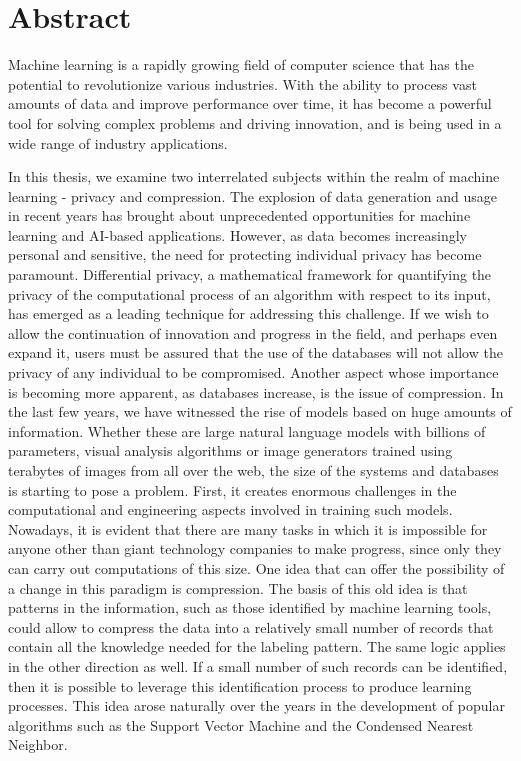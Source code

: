 \chapter*{Abstract}

Machine learning is a rapidly growing field of computer science that has the potential to revolutionize various industries. With the ability to process vast amounts of data and improve performance over time, it has become a powerful tool for solving complex problems and driving innovation, and is being used in a wide range of industry applications.


In this thesis, we examine two interrelated subjects within the realm of machine learning - privacy and compression. 
The explosion of data generation and usage in recent years has brought about unprecedented opportunities for machine learning and AI-based applications. However, as data becomes increasingly personal and sensitive, the need for protecting individual privacy has become paramount. 
Differential privacy, a mathematical framework for quantifying the privacy of the computational process of an algorithm  with respect to its input, has emerged as a leading technique for addressing this challenge. 
If we wish to allow the continuation of innovation and progress in the field, and perhaps even expand it, users must be assured that the use of the databases will not allow the privacy of any individual to be compromised.
Another aspect whose importance is becoming more apparent, as databases increase, is the issue of compression. In the last few years, we have witnessed the rise of models based on huge amounts of information. Whether these are large natural language models with billions of parameters, visual analysis algorithms or image generators trained using terabytes of images from all over the web, the size of the systems and databases is starting to pose a problem.
First, it creates enormous challenges in the computational and engineering aspects involved in training such models. Nowadays, it is evident that there are many tasks in which it is impossible for anyone other than giant technology companies to make progress, since only they can carry out computations of this size.
One idea that can offer the possibility of a change in this paradigm is compression. The basis of this old idea is that patterns in the information, such as those identified by machine learning tools, could allow to compress the data into a relatively small number of records that contain all the knowledge needed for the labeling pattern. 
The same logic applies in the other direction as well. If a small number of such records can be identified, then it is possible to leverage this identification process to produce learning processes. This idea arose naturally over the years in the development of popular algorithms such as the Support Vector Machine and the Condensed Nearest Neighbor.
